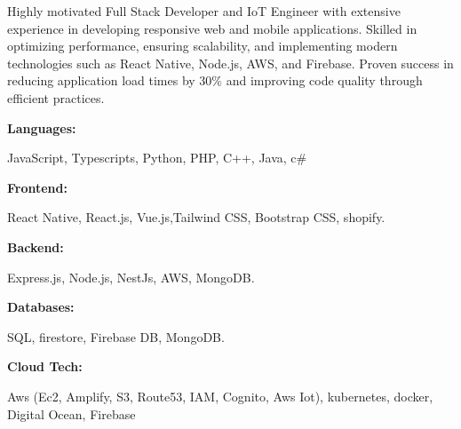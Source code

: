 \documentclass[9pt]{developercv}
\begin{document}
\begin{minipage}[t]{0.5\textwidth}
    \vspace{-1pt}
    Highly motivated Full Stack Developer and IoT Engineer with extensive experience in developing responsive web and mobile applications. Skilled in optimizing performance, ensuring scalability, and implementing modern technologies such as React Native, Node.js, AWS, and Firebase. Proven success in reducing application load times by 30\% and improving code quality through efficient practices.
\end{minipage}
\hfill %
\begin{minipage}[t]{0.465\textwidth}
    \vspace{0.5pt}

    \begin{minipage}[t]{1\textwidth}
        \textbf{Languages:}
    \end{minipage}
    \hfill
    \begin{minipage}[t]{1\textwidth}
        JavaScript, Typescripts, Python, PHP, C++, Java, c\# \end{minipage}


    \begin{minipage}[t]{1\textwidth}
        \textbf{Frontend:}
    \end{minipage}
    \hfill
    \begin{minipage}[t]{1\textwidth}
        React Native, React.js, Vue.js,Tailwind CSS, Bootstrap CSS, shopify. \end{minipage}

    \begin{minipage}[t]{1\textwidth}
        \textbf{Backend:}
    \end{minipage}
    \hfill
    \begin{minipage}[t]{1\textwidth}
        Express.js, Node.js, NestJs, AWS, MongoDB.
    \end{minipage}

    \begin{minipage}[t]{1\textwidth}
        \textbf{Databases:}
    \end{minipage}
    \hfill
    \begin{minipage}[t]{1\textwidth}
        SQL, firestore, Firebase DB, MongoDB.
    \end{minipage}
    \begin{minipage}[t]{1\textwidth}
        \textbf{Cloud Tech:}
    \end{minipage}
    \hfill
    \begin{minipage}[t]{1\textwidth}
        Aws (Ec2, Amplify, S3, Route53, IAM, Cognito, Aws Iot), kubernetes, docker, Digital Ocean, Firebase
    \end{minipage}
\end{minipage}
\end{document}
